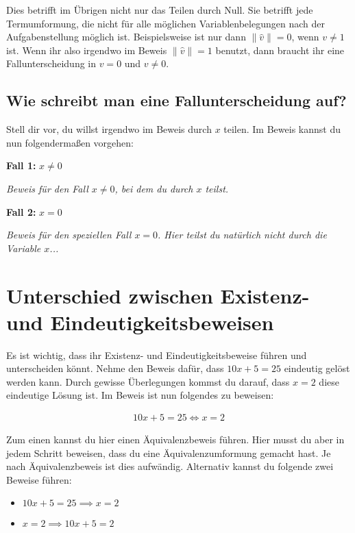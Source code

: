 \documentclass[a4paper]{article}
\begin{document}
Dies betrifft im Übrigen nicht nur das Teilen durch Null. Sie betrifft jede Termumformung, die nicht für alle möglichen Variablenbelegungen nach der Aufgabenstellung möglich ist. Beispielsweise ist nur dann $\|\hat v\| = 0$, wenn $v\neq 1$ ist. Wenn ihr also irgendwo im Beweis $\|\hat v\|=1$ benutzt, dann braucht ihr eine Fallunterscheidung in $v=0$ und $v\neq 0$.

\subsection{Wie schreibt man eine Fallunterscheidung auf?}

Stell dir vor, du willst irgendwo im Beweis durch $x$ teilen. Im Beweis kannst du nun folgendermaßen vorgehen:

\begin{addmargin}{2cm}
  \textbf{Fall 1:} $x\neq 0$

  \emph{Beweis für den Fall $x\neq 0$, bei dem du durch $x$ teilst.}

  \textbf{Fall 2:} $x = 0$

  \emph{Beweis für den speziellen Fall $x=0$. Hier teilst du natürlich nicht durch die Variable $x$... \smiley{}}
\end{addmargin}

\section{Unterschied zwischen Existenz- und Eindeutigkeitsbeweisen}

Es ist wichtig, dass ihr Existenz- und Eindeutigkeitsbeweise führen und unterscheiden könnt. Nehme den Beweis dafür, dass $10x+5 = 25$ eindeutig gelöst werden kann. Durch gewisse Überlegungen kommst du darauf, dass $x=2$ diese eindeutige Lösung ist. Im Beweis ist nun folgendes zu beweisen:

\begin{align}
  10x+5=25 \iff x=2
\end{align}

Zum einen kannst du hier einen Äquivalenzbeweis führen. Hier musst du aber in jedem Schritt beweisen, dass du eine Äquivalenzumformung gemacht hast. Je nach Äquivalenzbeweis ist dies aufwändig. Alternativ kannst du folgende zwei Beweise führen:

\begin{itemize}
  \item $10x+5=25 \implies x=2$
  \item $x=2\implies 10x+5=2$
\end{itemize}
\end{document}

